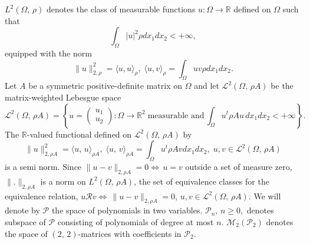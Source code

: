 \documentclass[11pt]{article}
\begin{document}
	$L^2(\Omega,\, \rho)$ denotes the class of measurable functions $u:\Omega\rightarrow\mathbb{R}$ defined on $\Omega$ such that $$\int_{\Omega}|u|^2\rho dx_1dx_2<+\infty,$$ equipped with the norm 
	\begin{equation*}
		\|u\|_{2,\rho}^2=\langle u,u\rangle_{\rho},\;\langle u,v\rangle_{\rho}=\int_{\Omega}uv\rho dx_1dx_2.
	\end{equation*}
	Let $A$ be a symmetric positive-definite matrix on $\Omega$ and let $\mathcal{L}^2(\Omega,\,   \rho A)$ be the matrix-weighted Lebesgue space
	$$\mathcal{L}^2(\Omega,\,   \rho A)= \left\{ u= \begin{pmatrix}u_1\\ u_2\end{pmatrix}: \Omega \to \mathbb{R}^2 \; \text{measurable and}\, \displaystyle\int_\Omega u^t\rho A u \,dx_1dx_2< +\infty\right\}.$$ 
	The $\mathbb{R}$-valued functional defined on $\mathcal{L}^2(\Omega,\,   \rho A)$ by
	\begin{equation}\label{ie4}
		\|u\|_{2,\rho A}^2=\langle u,\,u\rangle_{\rho A},\;{\langle u,\,v \rangle_{\rho A}} =\int_{\Omega}u^t\rho A vdx_1dx_2,\;u,v\in \mathcal{L}^2(\Omega,\,  \rho A)
	\end{equation} 
	is a semi norm.
	Since $\|u-v\|_{2,\rho A}=0\Leftrightarrow\,u=v$ outside a set of measure zero,  $\|.\|_{2,\rho A}$ is a norm on $L^2(\Omega,\,  \rho A)$, the set of equivalence classes for the equivalence relation,  $u\mathcal{R}v\Leftrightarrow\,\|u-v\|_{2,\rho A}=0$, $u,v\in\mathcal{L}^2(\Omega,\,   \rho A)$. 
	We will denote by $\mathcal{P}$ the space of polynomials in two variables. $\mathcal{P}_n,\,n\geq 0,$ denotes subspace of $\mathcal{P}$ consisting of polynomials of degree at most $n$. $\mathcal{M}_2(\mathcal{P}_2)$ denotes the space of $(2,\,2)$-matrices with coefficients in $\mathcal{P}_2$.
	
\end{document}
